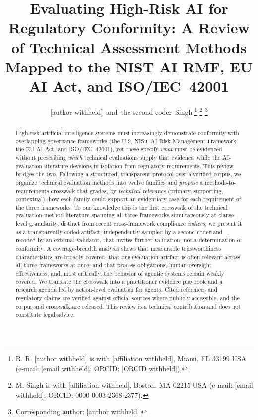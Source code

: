 \documentclass[journal]{IEEEtran}
\begin{document}
\title{Evaluating High-Risk AI for Regulatory Conformity: A Review of Technical
Assessment Methods Mapped to the NIST AI RMF, EU AI Act, and ISO/IEC~42001}

\author{[author withheld]~and~the second coder~Singh%
\thanks{R. R. [author withheld] is with [affiliation withheld], Miami, FL 33199 USA (e-mail: [email withheld]; ORCID: [ORCID withheld]).}%
\thanks{M. Singh is with [affiliation withheld], Boston, MA 02215 USA (e-mail: [email withheld]; ORCID: 0000-0003-2368-2377).}%
\thanks{Corresponding author: [author withheld].}}


\maketitle

\begin{abstract}
High-risk artificial intelligence systems must increasingly demonstrate conformity with
overlapping governance frameworks (the U.S. NIST AI Risk Management Framework, the EU AI
Act, and ISO/IEC~42001), yet these specify \emph{what} must be
evidenced without prescribing \emph{which} technical evaluations supply that evidence, while
the AI-evaluation literature develops in isolation from regulatory requirements. This review
bridges the two. Following a structured, transparent protocol over a verified corpus, we
organize technical evaluation methods into twelve families and \emph{propose} a
methods-to-requirements crosswalk that grades, by \emph{technical relevance} (primary,
supporting, contextual), how each family could support an evidentiary case for each
requirement of the three frameworks. To our knowledge this is the first crosswalk of the
technical evaluation-method literature spanning all three frameworks simultaneously at
clause-level granularity, distinct from recent cross-framework compliance \emph{indices}; we present it as a transparently coded
artifact, independently sampled by a second coder and recoded by an external validator, that
invites further validation, not a determination of conformity. A coverage-breadth analysis shows that measurable
trustworthiness characteristics are broadly covered, that one evaluation artifact is often
relevant across all three frameworks at once, and that process obligations, human-oversight
effectiveness, and, most critically, the behavior of agentic systems remain weakly
covered. We translate the crosswalk into a practitioner evidence playbook and a research
agenda led by action-level evaluation for agents. Cited references and regulatory claims are
verified against official sources where publicly accessible, and the corpus and crosswalk are released. This review is
a technical contribution and does not constitute legal advice.
\end{abstract}
\end{document}
